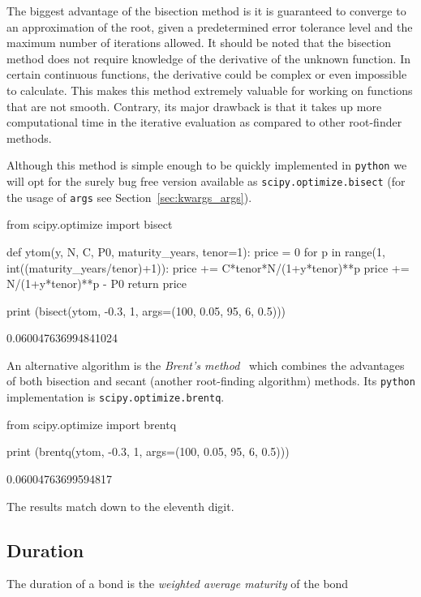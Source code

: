 The biggest advantage of the bisection method is it is guaranteed to converge to an approximation of the root, given a predetermined error tolerance level and the maximum number of iterations allowed. It should be noted that the bisection method does not require knowledge of the derivative of the unknown function. In certain continuous functions, the derivative could be complex or even impossible to calculate. This makes this method extremely valuable for working on functions that are not smooth.
Contrary, its major drawback is that it takes up more computational time in the iterative evaluation as compared to other root-finder methods. 

Although this method is simple enough to be quickly implemented in \texttt{python} we will opt for the surely bug free version available as \texttt{scipy.optimize.bisect} (for the usage of \texttt{args} see Section~\ref{sec:kwargs_args}).

\begin{ipythonnon}
from scipy.optimize import bisect 

def ytom(y, N, C, P0, maturity_years, tenor=1): 
	price = 0
	for p in range(1, int((maturity_years/tenor)+1)):
		price += C*tenor*N/(1+y*tenor)**p
	price += N/(1+y*tenor)**p - P0 
	return price

print (bisect(ytom, -0.3, 1, args=(100, 0.05, 95, 6, 0.5)))
\end{ipythonnon}
\begin{ioutput}
0.060047636994841024
\end{ioutput}

An alternative algorithm is the \emph{Brent's method}~\cite{bib:brent} which combines the advantages of both bisection and secant (another root-finding algorithm) methods. Its \texttt{python} implementation is \texttt{scipy.optimize.brentq}.

\begin{ipythonnon}
from scipy.optimize import brentq
    
print (brentq(ytom, -0.3, 1, args=(100, 0.05, 95, 6, 0.5)))
\end{ipythonnon}
\begin{ioutput}
0.06004763699594817
\end{ioutput}

\noindent
The results match down to the eleventh digit.

\subsection{Duration}
The duration of a bond is the \emph{weighted average maturity} of the bond

